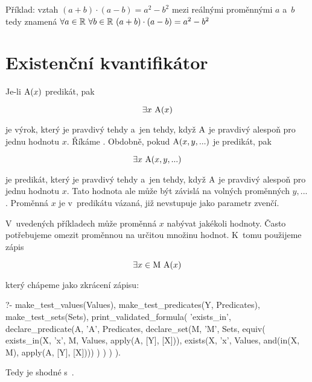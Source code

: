 Příklad: vztah \((a + b) \cdot (a - b) = a^2 - b^2\) mezi reálnými proměnnými \(a\) a~\(b\) tedy znamená \(\forall a \in \mathbb{R} \ \forall b \in \mathbb{R} \ (a + b) \cdot (a - b) = a^2 - b^2\)

\section{Existenční kvantifikátor}

Je-li \(\mathrm{A}(x)\) predikát, pak

\begin{equation}
\exists x \ \predicate{A}(x)
\end{equation}

je výrok, který je pravdivý tehdy a~jen tehdy, když \(\mathrm{A}\) je pravdivý alespoň pro jednu hodnotu \(x\). Říkáme . Obdobně, pokud \(\mathrm{A}(x, y, ...)\) je predikát, pak

\begin{equation}
\exists x \ \mathrm{A}(x, y, ...)
\end{equation}

je predikát, který je pravdivý tehdy a~jen tehdy, když \(\mathrm{A}\) je pravdivý alespoň pro jednu hodnotu \(x\). Tato hodnota ale může být závislá na volných proměnných \(y, ...\). Proměnná \(x\) je v~predikátu vázaná, již nevstupuje jako parametr zvenčí.

V~uvedených příkladech může proměnná \(x\) nabývat jakékoli hodnoty. Často potřebujeme omezit proměnnou na určitou množinu hodnot. K~tomu použijeme zápis

\begin{equation}
\exists x \in \mathrm{M} \ \predicate{A}(x)
\end{equation}

který chápeme jako zkrácení zápisu:

\begin{prolog}
?- 	make_test_values(Values),
	make_test_predicates(Y, Predicates),
	make_test_sets(Sets),
	print_validated_formula(
		'exists_in',
		declare_predicate(A, 'A', Predicates,
			declare_set(M, 'M', Sets,
				equiv(
					exists_in(X, 'x', M, Values, apply(A, [Y], [X])),
					exists(X, 'x', Values, and(in(X, M), apply(A, [Y], [X])))
				)
			)
		)
	).
\end{prolog}

Tedy  je shodné s~.

